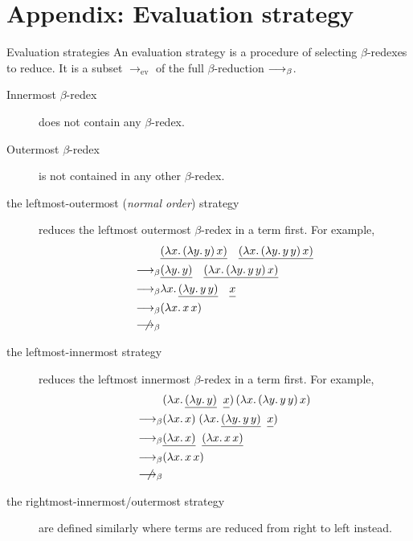 \appendix 
\section{Appendix: Evaluation strategy}
\begin{frame}[allowframebreaks]{Evaluation strategies}
An evaluation strategy is a procedure of selecting $\beta$-redexes
to reduce. It is a subset $\longrightarrow_{\mathrm{ev}}$ of the full
$\beta$-reduction $\longrightarrow_{\beta}$.

\begin{description}
  \item[Innermost $\beta$-redex] does not contain any $\beta$-redex.
  \item[Outermost $\beta$-redex] is not contained in any other $\beta$-redex.
\end{description}

\begin{description}
  \item[the leftmost-outermost (\emph{normal order}) strategy] reduces the leftmost outermost
    $\beta$-redex in a term first. For example, 
    \begin{align*}
      & 
      \underline{(\lambda x.\, (\lambda y.\, y)\,x)}\quad
      \underline{(\lambda x.\, (\lambda y.\, y\,y)\,x)}
      \\
      \onereduce &
      \underline{(\lambda y.\, y)}\quad
      \underline{(\lambda x.\, (\lambda y.\, y\,y)\, x)} \\
      \onereduce &
      \lambda x.\, \underline{(\lambda y.\, y\,y)}\quad
      \underline{\vphantom{(\lambda}x} \\
      \onereduce & (\lambda x.\, x\,x) \\
      \notonereduce
    \end{align*}
  \item[the leftmost-innermost strategy] reduces the leftmost innermost
    $\beta$-redex in a term first. For example, 
    \begin{align*}
      & (\lambda x.\, \underline{(\lambda y.\,
        y)}\;\;\underline{\vphantom{(\lambda} x})\,
      (\lambda x.\, (\lambda y.\, y\, y)\,x) \\
      \onereduce & (\lambda x.\,x)\;
      (\lambda x.\, \underline{(\lambda y.\, y\,
        y)}\;\;\underline{\vphantom{(\lambda}x}) \\
      \onereduce & \underline{(\lambda x.\,x)}\;\;\underline{(\lambda x.\, x\,x)} \\
      \onereduce & (\lambda x.\, x\, x) \\
      \notonereduce
    \end{align*}
  \item[the rightmost-innermost/outermost strategy]
    are defined similarly where terms are reduced from right to left
    instead.
\end{description}
\end{frame}

